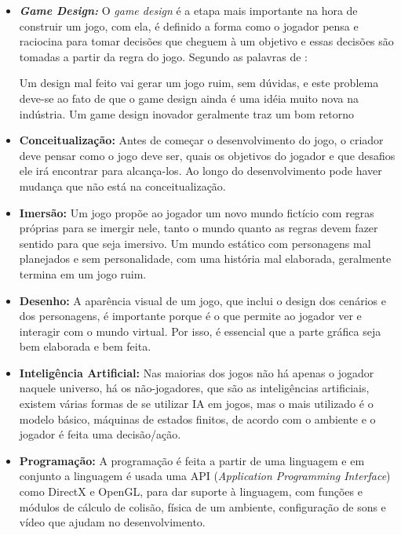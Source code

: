 \begin{itemize}
	\item \textbf{\textit{Game Design:}} O \textit{game design} é a etapa mais importante na hora de construir um 
	jogo, com ela, é definido a forma como o jogador pensa e raciocina para tomar decisões que cheguem à um objetivo 
	e essas decisões são tomadas a partir da regra do jogo. Segundo as palavras de \cite{morais2009jogos}:
		\begin{citacao}
			Um design mal feito vai gerar um jogo ruim, sem dúvidas, e este problema deve-se ao fato de que o game design ainda é uma idéia muito nova na indústria. Um game design inovador geralmente traz um bom retorno
		\end{citacao}
	\item \textbf{Conceitualização:} Antes de começar o desenvolvimento do jogo, 
	o criador deve pensar como o jogo deve ser, quais os objetivos do jogador e que desafios ele irá encontrar para alcança-los.
	Ao longo do desenvolvimento pode haver mudança que não está na conceitualização.
	\item \textbf{Imersão:} Um jogo propõe ao jogador um novo mundo fictício com regras próprias para se imergir nele, 
	tanto o mundo quanto as regras devem fazer sentido para que seja imersivo. Um mundo estático com personagens mal planejados e sem personalidade,
	 com uma história mal elaborada, geralmente termina em um jogo ruim.
	\item \textbf{Desenho:} A aparência visual de um jogo, que inclui o design dos cenários e dos personagens, é importante porque é o que 
	permite ao jogador ver e interagir com o mundo virtual. Por isso, é essencial que a parte gráfica seja bem elaborada e bem feita.
	\item \textbf{Inteligência Artificial:} Nas maiorias dos jogos não há apenas o jogador naquele universo, há os não-jogadores, 
	que são as inteligências artificiais, existem várias formas de se utilizar IA em jogos, mas o mais utilizado é o modelo básico, máquinas de estados finitos,
	de acordo com o ambiente e o jogador é feita uma decisão/ação.
	\item \textbf{Programação:} A programação é feita a partir de uma linguagem e em conjunto a linguagem é usada uma API (\textit{Application
	Programming Interface}) como DirectX e OpenGL, para dar suporte à linguagem, com funções e módulos de cálculo de colisão, física de um
ambiente, configuração de sons e vídeo que ajudam no desenvolvimento.
\end{itemize}

